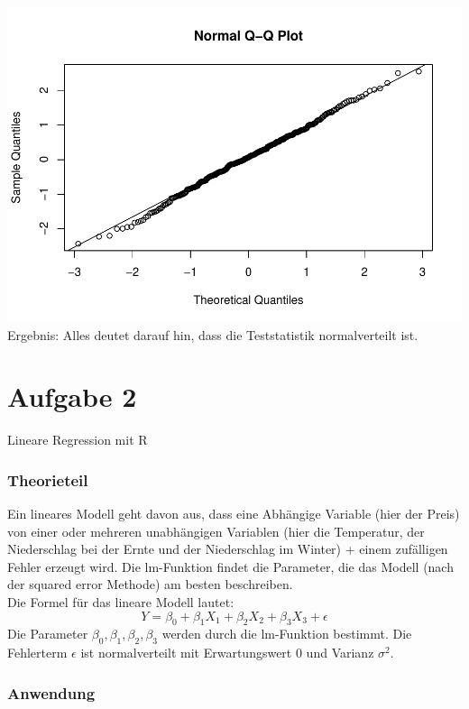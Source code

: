 \documentclass[]{article}
\begin{document}
\includegraphics{BelaSchinkeAusarbeitung_files/figure-latex/unnamed-chunk-10-1.pdf}
Ergebnis: Alles deutet darauf hin, dass die Teststatistik normalverteilt ist.

\hypertarget{aufgabe-2}{%
\section{Aufgabe 2}\label{aufgabe-2}}

Lineare Regression mit R

\hypertarget{theorieteil-3}{%
\subsubsection{Theorieteil}\label{theorieteil-3}}

Ein lineares Modell geht davon aus, dass eine Abhängige Variable (hier der Preis) von einer oder mehreren
unabhängigen Variablen (hier die Temperatur, der Niederschlag bei der Ernte und der Niederschlag im Winter) +
einem zufälligen Fehler erzeugt wird. Die lm-Funktion findet die Parameter, die das Modell
(nach der squared error Methode) am besten beschreiben.\\
Die Formel für das lineare Modell lautet:
\[
Y = \beta_0 + \beta_1 X_1 + \beta_2 X_2 + \beta_3 X_3 + \epsilon
\]
Die Parameter \(\beta_0, \beta_1, \beta_2, \beta_3\) werden durch die lm-Funktion bestimmt.
Die Fehlerterm \(\epsilon\) ist normalverteilt mit Erwartungswert 0 und Varianz \(\sigma^2\).

\hypertarget{anwendung-3}{%
\subsubsection{Anwendung}\label{anwendung-3}}
\end{document}
